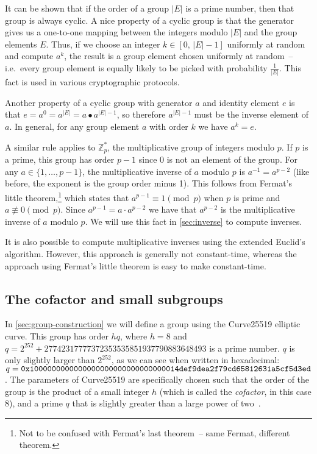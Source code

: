 \documentclass[manuscript]{acmart}
\begin{document}
It can be shown that if the order of a group $|E|$ is a prime number, then that group is always cyclic.
A nice property of a cyclic group is that the generator gives us a one-to-one mapping between the integers modulo $|E|$ and the group elements $E$.
Thus, if we choose an integer $k \in [0,\, |E|-1]$ uniformly at random and compute $a^k$, the result is a group element chosen uniformly at random~-- i.e.\ every group element is equally likely to be picked with probability $\frac{1}{|E|}$.
This fact is used in various cryptographic protocols.

Another property of a cyclic group with generator $a$ and identity element $e$ is that $e = a^0 = a^{|E|} = a \bullet a^{|E|-1}$, so therefore $a^{|E|-1}$ must be the inverse element of $a$.
In general, for any group element $a$ with order $k$ we have $a^k = e$.

A similar rule applies to $\mathbb{Z}_p^*$, the multiplicative group of integers modulo $p$.
If $p$ is a prime, this group has order $p-1$ since 0 is not an element of the group.
For any $a \in \{1, \dots, p-1\}$, the multiplicative inverse of $a$ modulo $p$ is $a^{-1} = a^{p-2}$ (like before, the exponent is the group order minus 1).
This follows from Fermat's little theorem,\footnote{Not to be confused with Fermat's last theorem~-- same Fermat, different theorem.} which states that $a^{p-1} \equiv 1 \pmod{p}$ when $p$ is prime and $a \not\equiv 0 \pmod{p}$.
Since $a^{p-1} = a \cdot a^{p-2}$ we have that $a^{p-2}$ is the multiplicative inverse of $a$ modulo $p$.
We will use this fact in \autoref{sec:inverse} to compute inverses.

It is also possible to compute multiplicative inverses using the extended Euclid's algorithm.
However, this approach is generally not constant-time, whereas the approach using Fermat's little theorem is easy to make constant-time.

\subsection{The cofactor and small subgroups}\label{sec:cofactor}

In \autoref{sec:group-construction} we will define a group using the Curve25519 elliptic curve.
This group has order $hq$, where $h=8$ and $q = 2^{252} + 27742317777372353535851937790883648493$ is a prime number.
$q$ is only slightly larger than $2^{252}$, as we can see when written in hexadecimal: $q = \verb|0x1000000000000000000000000000000014def9dea2f79cd65812631a5cf5d3ed|$.
The parameters of Curve25519 are specifically chosen such that the order of the group is the product of a small integer $h$ (which is called the \emph{cofactor}, in this case 8), and a prime $q$ that is slightly greater than a large power of two~\cite{Bernstein:2006kw}.
\end{document}
